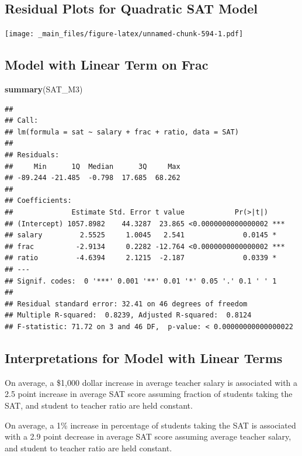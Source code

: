\documentclass[]{book}
\newenvironment{Shaded}{\begin{snugshade}}{\end{snugshade}}
\newcommand{\KeywordTok}[1]{\textcolor[rgb]{0.13,0.29,0.53}{\textbf{#1}}}
\newcommand{\NormalTok}[1]{#1}
\begin{document}
\subsection{Residual Plots for Quadratic SAT
Model}\label{residual-plots-for-quadratic-sat-model}

\texttt{[image: \_main\_files/figure-latex/unnamed-chunk-594-1.pdf]}

\subsection{Model with Linear Term on
Frac}\label{model-with-linear-term-on-frac}

\begin{Shaded}
\begin{Highlighting}[]
\KeywordTok{summary}\NormalTok{(SAT_M3)}
\end{Highlighting}
\end{Shaded}

\begin{verbatim}
## 
## Call:
## lm(formula = sat ~ salary + frac + ratio, data = SAT)
## 
## Residuals:
##     Min      1Q  Median      3Q     Max 
## -89.244 -21.485  -0.798  17.685  68.262 
## 
## Coefficients:
##              Estimate Std. Error t value            Pr(>|t|)    
## (Intercept) 1057.8982    44.3287  23.865 <0.0000000000000002 ***
## salary         2.5525     1.0045   2.541              0.0145 *  
## frac          -2.9134     0.2282 -12.764 <0.0000000000000002 ***
## ratio         -4.6394     2.1215  -2.187              0.0339 *  
## ---
## Signif. codes:  0 '***' 0.001 '**' 0.01 '*' 0.05 '.' 0.1 ' ' 1
## 
## Residual standard error: 32.41 on 46 degrees of freedom
## Multiple R-squared:  0.8239, Adjusted R-squared:  0.8124 
## F-statistic: 71.72 on 3 and 46 DF,  p-value: < 0.00000000000000022
\end{verbatim}

\subsection{Interpretations for Model with Linear
Terms}\label{interpretations-for-model-with-linear-terms}

On average, a \$1,000 dollar increase in average teacher salary is
associated with a 2.5 point increase in average SAT score assuming
fraction of students taking the SAT, and student to teacher ratio are
held constant.

On average, a 1\% increase in percentage of students taking the SAT is
associated with a 2.9 point decrease in average SAT score assuming
average teacher salary, and student to teacher ratio are held constant.
\end{document}
